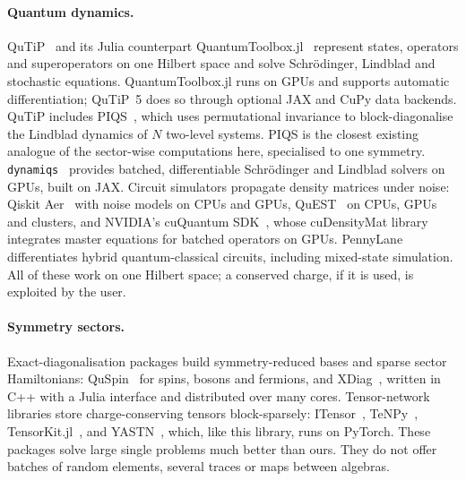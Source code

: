 \documentclass[11pt]{article}
\begin{document}
\paragraph{Quantum dynamics.} QuTiP~\cite{johansson2013,lambert2026} and its Julia counterpart
QuantumToolbox.jl~\cite{mercurio2025} represent states, operators and superoperators on one Hilbert space and solve
Schrödinger, Lindblad and stochastic equations. QuantumToolbox.jl runs on GPUs and supports automatic
differentiation; QuTiP~5 does so through optional JAX and CuPy data backends. QuTiP includes PIQS~\cite{shammah2018},
which uses permutational invariance to block-diagonalise the Lindblad dynamics of $N$ two-level systems. PIQS is the
closest existing analogue of the sector-wise computations here, specialised to one symmetry.
\texttt{dynamiqs}~\cite{dynamiqs} provides batched, differentiable Schrödinger and Lindblad solvers on GPUs, built on
JAX. Circuit simulators propagate density matrices under noise: Qiskit Aer~\cite{qiskit2019,qiskitaer} with noise
models on CPUs and GPUs, QuEST~\cite{quest2019} on CPUs, GPUs and clusters, and NVIDIA's cuQuantum
SDK~\cite{bayraktar2023}, whose cuDensityMat library~\cite{cudensitymat} integrates master equations for batched
operators on GPUs. PennyLane~\cite{bergholm2018} differentiates hybrid quantum-classical circuits, including mixed-state
simulation. All of these work on one Hilbert space; a conserved charge, if it is used, is exploited by the user.

\paragraph{Symmetry sectors.} Exact-diagonalisation packages build symmetry-reduced bases and sparse sector
Hamiltonians: QuSpin~\cite{weinberg2017,weinberg2019} for spins, bosons and fermions, and XDiag~\cite{wietek2026},
written in C++ with a Julia interface and distributed over many cores. Tensor-network libraries store
charge-conserving tensors block-sparsely: ITensor~\cite{fishman2022}, TeNPy~\cite{hauschild2018},
TensorKit.jl~\cite{devos2025}, and YASTN~\cite{rams2025}, which, like this library, runs on PyTorch. These packages
solve large single problems much better than ours. They do not offer batches of random elements, several traces or
maps between algebras.
\end{document}
